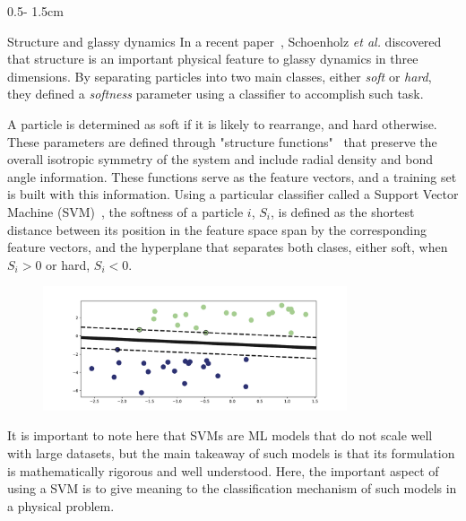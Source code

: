 \documentclass{uioposter}
\newcommand{\etal}{\emph{et al. }}
\begin{document}
\begin{frame}
\begin{columns}[onlytextwidth]
\begin{column}{0.5\textwidth - 1.5cm}

    \begin{block}{Structure and glassy dynamics}
        In a recent paper~\cite{glassy2016}, Schoenholz \etal discovered that structure
        is an important physical feature to glassy dynamics in three dimensions. By
        separating particles into two main classes, either \emph{soft} or \emph{hard},
        they defined a \emph{softness} parameter using a classifier to accomplish such task.

        A particle is determined as soft if it is likely to rearrange, and hard otherwise.
        These parameters are defined through "structure functions"~\cite{behler2007generalized}
        that preserve the overall isotropic symmetry of the system
        and include radial density and bond angle information. These functions serve as the
        feature vectors, and a training set is built with this information. Using a particular
        classifier called a Support Vector Machine (SVM)~\cite{friedman2001elements},
        the softness of a particle $i$, $S_i$, is defined as the shortest distance between its position
        in the feature space span by the corresponding feature vectors, and the hyperplane
        that separates both clases, either soft, when $S_i > 0$ or hard, $S_i < 0.$

        \begin{figure}
            \centering
            \includegraphics[width=0.8\textwidth]{uioposter-images/fig2.pdf}
        \end{figure}

        It is important to note here that SVMs are ML models that do not scale well with
        large datasets, but the main takeaway of such models is that its formulation
        is mathematically rigorous and well understood. Here, the important aspect of
        using a SVM is to give meaning to the classification mechanism of such models
        in a physical problem.
    \end{block}


\end{column}
\end{columns}
\end{frame}
\end{document}
